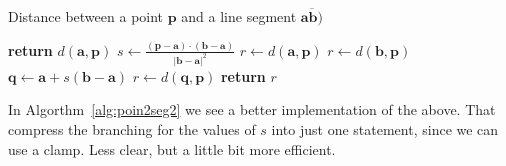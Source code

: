 {\centering
\begin{minipage}{\linewidth}
  \begin{algorithm}[H]
    \caption{Distance between a point $\mathbf{p}$ and a line segment $\overline{\mathbf{a}\mathbf{b})}$}
    \label{alg:poin2seg}
    \begin{algorithmic}[1] %
       
         
          \State \textbf{return} $d(\mathbf{a},\mathbf{p})$
        \EndIf
        \State $s \gets \frac{(\mathbf{p} - \mathbf{a}) \cdot (\mathbf{b} - \mathbf{a})}{|\mathbf{b} - \mathbf{a}|^2}$ 
         
          \State $r \gets d(\mathbf{a},\mathbf{p})$
          
          \State $r \gets d(\mathbf{b},\mathbf{p})$
        \Else {}
          \State $\mathbf{q} \gets \mathbf{a} + s (\mathbf{b} - \mathbf{a})$ 
          \State $r \gets d(\mathbf{q},\mathbf{p})$
        \EndIf
        \State \textbf{return} $r$ 
      \EndProcedure
    \end{algorithmic}
  \end{algorithm}
\end{minipage}
\par
}

In Algorthm~\ref{alg:poin2seg2} we see a better implementation of the above. That compress the branching for the values of $s$ into just one statement, since we can use a clamp. Less clear, but a little bit more efficient.

